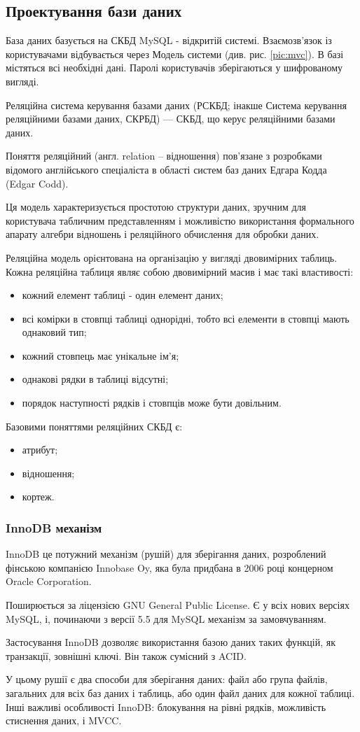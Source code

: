 \subsection{Проектування бази даних}
База даних базується на СКБД MySQL - відкритій системі. Взаємозв'язок із користувачами відбувається через Модель системи (див. рис. \ref{pic:mvc}). В базі містяться всі необхідні дані. Паролі користувачів зберігаються у шифрованому вигляді.
\par Реляційна система керування базами даних (РСКБД; інакше Система керування реляційними базами даних, СКРБД) — СКБД, що керує реляційними базами даних.
\par Поняття реляційний (англ. relation -- відношення) пов'язане з розробками відомого англійського спеціаліста в області систем баз даних Едгара Кодда (Edgar Codd).
\par Ця модель характеризується простотою структури даних, зручним для користувача табличним представленням і можливістю використання формального апарату алгебри відношень і реляційного обчислення для обробки даних.
\par Реляційна модель орієнтована на організацію у вигляді двовимірних таблиць. Кожна реляційна таблиця являє собою двовимірний масив і має такі властивості:
\begin{itemize}
	\item кожний елемент таблиці - один елемент даних;
	\item всі комірки в стовпці таблиці однорідні, тобто всі елементи в стовпці мають однаковий тип;
	\item кожний стовпець має унікальне ім'я;
	\item однакові рядки в таблиці відсутні;
	\item порядок наступності рядків і стовпців може бути довільним.
\end{itemize}
Базовими поняттями реляційних СКБД є:
\begin{itemize}
	\item атрибут;
	\item відношення;
	\item кортеж.
\end{itemize}

\subsubsection{InnoDB механізм}
\par InnoDB це потужний механізм (рушій) для зберігання даних, розроблений фінською компанією Innobase Oy, яка була придбана в 2006 році концерном Oracle Corporation.
\par Поширюється за ліцензією GNU General Public License. Є у всіх нових версіях MySQL, і, починаючи з версії 5.5 для MySQL механізм за замовчуванням.
\par Застосування InnoDB дозволяє використання базою даних таких функцій, як транзакції, зовнішні ключі. Він також сумісний з ACID.
\par У цьому рушії є два способи для зберігання даних: файл або група файлів, загальних для всіх баз даних і таблиць, або один файл даних для кожної таблиці. Інші важливі особливості InnoDB: блокування на рівні рядків, можливість стиснення даних, і MVCC.

